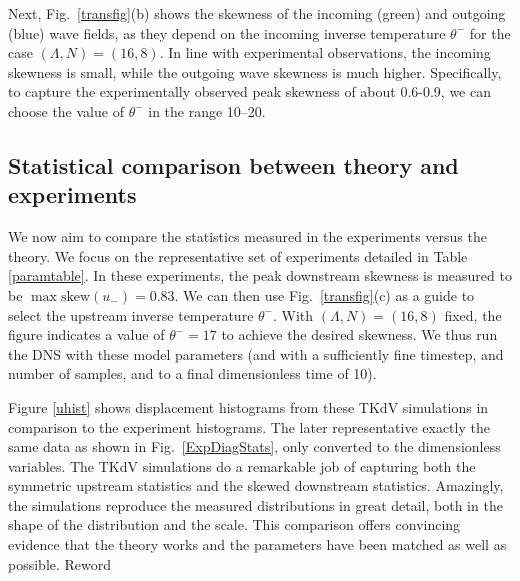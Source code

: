\documentclass[11pt]{article}
\newcommand{\nick}[1]{{\color{red} #1}}
\newcommand{\lamfac}{N}
\newcommand{\skw}{\text{skew}}
\newcommand{\uup}{u_{-}}
\newcommand{\thup}{\theta^{-}}
\begin{document}
	Next, Fig.~\ref{transfig}(b) shows the skewness of the incoming (green) and outgoing (blue) wave fields, as they depend on the incoming inverse temperature $\thup$ for the case $(\Lambda, \lamfac) = (16, 8)$. In line with experimental observations, the incoming skewness is small, while the outgoing wave skewness is much higher. Specifically, to capture the experimentally observed peak skewness of about 0.6-0.9, we can choose the value of $\thup$ in the range 10--20.

\subsection{Statistical comparison between theory and experiments}

	We now aim to compare the statistics measured in the experiments versus the theory. We focus on the representative set of experiments detailed in Table \ref{paramtable}. In these experiments, the peak downstream skewness is measured to be $\max \skw(\uup) = 0.83$. We can then use Fig.~\ref{transfig}(c) as a guide to select the upstream inverse temperature $\thup$. With $(\Lambda, \lamfac) = (16, 8)$ fixed, the figure indicates a value of $\thup = 17$ to achieve the desired skewness. We thus run the DNS with these model parameters (and with a sufficiently fine timestep, and number of samples, and to a final dimensionless time of 10).
	
	Figure \ref{uhist} shows displacement histograms from these TKdV simulations in comparison to the experiment histograms. The later representative exactly the same data as shown in Fig.~\ref{ExpDiagStats}, only converted to the dimensionless variables. The TKdV simulations do a remarkable job of capturing both the symmetric upstream statistics and the skewed downstream statistics. Amazingly, the simulations reproduce the measured distributions in great detail, both in the shape of the distribution and the scale.
%
This comparison offers convincing evidence that the theory works and the parameters have been matched as well as possible. \nick{Reword}
\end{document}
